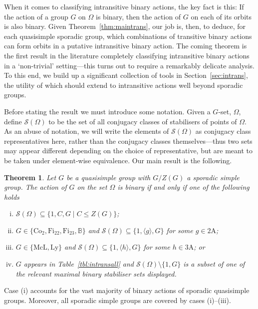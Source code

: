 \documentclass[11pt, a4paper]{amsart}
\newtheorem{thm}{Theorem}[section]  \newtheorem{lemma}[thm]{Lemma}     \newtheorem{cor}[thm]{Corollary}
\begin{document}
When it comes to classifying intransitive binary actions, the key fact is this: If the action of a group $G$ on $\Omega$ is binary, then the action of $G$ on each of its orbits is also binary. Given Theorem~\ref{thm:maintrans}, our job is, then, to deduce, for each quasisimple sporadic group, which combinations of transitive binary actions can form orbits in a putative intransitive binary action. The coming theorem is the first result in the literature completely classifying intransitive binary actions in a `non-trivial' setting---this turns out to require a remarkably delicate analysis. To this end, we build up a significant collection of tools in Section~\ref{sec:intrans}, the utility of which should extend to intransitive actions well beyond sporadic groups.

Before stating the result we must introduce some notation. Given a $G$-set, $\Omega$, define $\mathcal{S}(\Omega)$ to be the set of all conjugacy classes of stabilisers of points of $\Omega$. As an abuse of notation, we will write the elements of $\mathcal{S}(\Omega)$ as conjugacy class representatives here, rather than the conjugacy classes themselves---thus two sets may appear different depending on the choice of representative, but are meant to be taken under element-wise equivalence. Our main result is the following.
\begin{thm}\label{thm:main}
Let $G$ be a quasisimple group with $G/Z(G)$ a sporadic simple group. The action of $G$ on the set $\Omega$ is binary if and only if one of the following holds
\begin{enumerate}[(i)]
    \item $\mathcal{S}(\Omega)\subseteq\{1,C, G \mid C\leq Z(G)\}$;
    \item $G\in \{\mathrm{Co}_2,\mathrm{Fi}_{22},\mathrm{Fi}_{23},\mathbb{B}\}$ and $\mathcal{S}(\Omega)\subseteq\{ 1 ,\langle g\rangle , G \}$ for some $g\in\mathrm{2A}$;
    \item $G\in\{\mathrm{McL},\mathrm{Ly}\}$ and $\mathcal{S}(\Omega)\subseteq\{ 1 ,\langle h\rangle , G \}$ for some $h\in \mathrm{3A}$; or
    \item $G$ appears in Table~\ref{tbl:intransall} and $\mathcal{S}(\Omega)\setminus\{1,G\} $ is a subset of one of the relevant maximal binary stabiliser sets displayed.
\end{enumerate}
\end{thm}
\begin{rks}
    Case (i) accounts for the vast majority of binary actions of sporadic quasisimple groups. Moreover, all sporadic simple groups are covered by cases (i)--(iii).
\end{rks}
\end{document}
